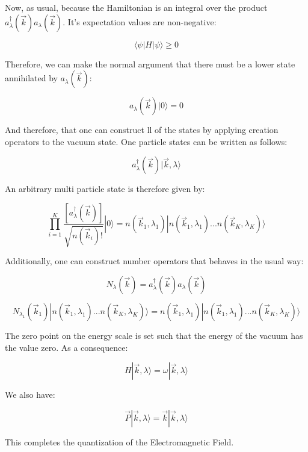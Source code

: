 \documentclass[a4]{article}
\begin{document}
    Now, as usual, because the Hamiltonian is an integral over the product $a^{\dagger}_{\lambda} (\vec{k}) a_{\lambda} (\vec{k})$. It's expectation
    values are non-negative:

    \begin{equation}
        \langle \psi | H | \psi \rangle \geq 0
    \end{equation}

    Therefore, we can make the normal argument that there must be a lower state annihilated by $a_{\lambda} (\vec{k})$:

    \begin{equation}
        a_{\lambda} (\vec{k}) | 0 \rangle = 0
    \end{equation}

    And therefore, that one can construct ll of the states by applying creation operators to the vacuum state. One particle states can be written as follows:

    \begin{equation}
        a^{\dagger}_{\lambda} (\vec{k}) | \vec{k}, \lambda \rangle 
    \end{equation}

    An arbitrary multi particle state is therefore given by:

    \begin{equation}
        \prod_{i = 1}^{K} \frac{[a^{\dagger}_{\lambda} (\vec{k})]}{\sqrt{n (\vec{k}_i)!}} | 0 \rangle = n (\vec{k}_{1}, \lambda_{1}) | n (\vec{k}_{1}, \lambda_{1}) ... n (\vec{k}_{K}, \lambda_{K}) \rangle
    \end{equation}

    Additionally, one can construct number operators that behaves in the usual way:

    \begin{equation}
        N_{\lambda} (\vec{k}) = a^{\dagger}_{\lambda} (\vec{k}) a_{\lambda} (\vec{k})
    \end{equation}

    \begin{equation}
        N_{\lambda_{1}} (\vec{k}_{1}) | n (\vec{k}_{1}, \lambda_{1}) ... n (\vec{k}_{K}, \lambda_{K}) \rangle = n (\vec{k}_{1}, \lambda_{1}) | n (\vec{k}_{1}, \lambda_{1}) ... n (\vec{k}_{K}, \lambda_{K}) \rangle
    \end{equation}

    The zero point on the energy scale is set such that the energy of the vacuum has the value zero. As a consequence:

    \begin{equation}
        H | \vec{k}, \lambda \rangle = \omega | \vec{k}, \lambda \rangle
    \end{equation}

    We also have:

    \begin{equation}
        \vec{P} | \vec{k}, \lambda \rangle = \vec{k} | \vec{k}, \lambda \rangle
    \end{equation}

    This completes the quantization of the Electromagnetic Field.
\end{document}
